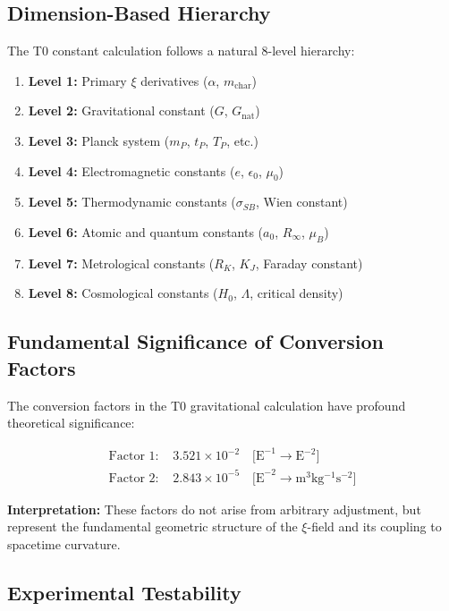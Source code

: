 	\subsection{Dimension-Based Hierarchy}
	
	The T0 constant calculation follows a natural 8-level hierarchy:
	
	\begin{enumerate}
		\item \textbf{Level 1:} Primary $\xi$ derivatives ($\alpha$, $m_{\text{char}}$)
		\item \textbf{Level 2:} Gravitational constant ($G$, $G_{\text{nat}}$)
		\item \textbf{Level 3:} Planck system ($m_P$, $t_P$, $T_P$, etc.)
		\item \textbf{Level 4:} Electromagnetic constants ($e$, $\epsilon_0$, $\mu_0$)
		\item \textbf{Level 5:} Thermodynamic constants ($\sigma_{SB}$, Wien constant)
		\item \textbf{Level 6:} Atomic and quantum constants ($a_0$, $R_\infty$, $\mu_B$)
		\item \textbf{Level 7:} Metrological constants ($R_K$, $K_J$, Faraday constant)
		\item \textbf{Level 8:} Cosmological constants ($H_0$, $\Lambda$, critical density)
	\end{enumerate}
	
	\subsection{Fundamental Significance of Conversion Factors}
	
	The conversion factors in the T0 gravitational calculation have profound theoretical significance:
	
	\begin{align}
		\text{Factor 1: } &3.521 \times 10^{-2} \quad \text{[E}^{-1} \rightarrow \text{E}^{-2}\text{]} \\
		\text{Factor 2: } &2.843 \times 10^{-5} \quad \text{[E}^{-2} \rightarrow \si{\meter^3 \kilogram^{-1} \second^{-2}}\text{]}
	\end{align}
	
	\textbf{Interpretation:} These factors do not arise from arbitrary adjustment, but represent the fundamental geometric structure of the $\xi$-field and its coupling to spacetime curvature.
	
	\subsection{Experimental Testability}
	
